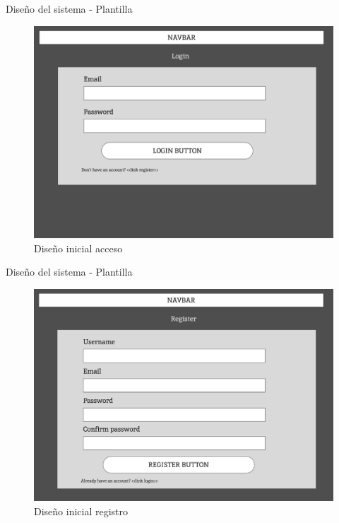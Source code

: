 \documentclass{beamer}
\begin{document}
    \begin{frame}{Diseño del sistema - Plantilla}

        \begin{figure}
            \centering
            \includegraphics[width=.8\textwidth]{Presentacion/mockup/login.png}
            \caption{Diseño inicial acceso}
        \end{figure}
        
    \end{frame}  

    \begin{frame}{Diseño del sistema - Plantilla}

        \begin{figure}
            \centering
            \includegraphics[width=.8\textwidth]{Presentacion/mockup/register.png}
            \caption{Diseño inicial registro}
        \end{figure}
        
    \end{frame}  
\end{document}
